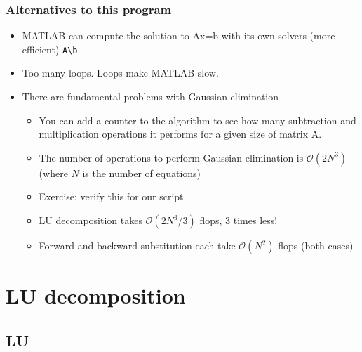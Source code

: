 \begin{frame}[fragile]
  \frametitle{Alternatives to this program}
  \begin{itemize}
    \item MATLAB can compute the solution to Ax=b with its own solvers (more efficient) \lstinline$A\b$
    \item Too many loops. Loops make MATLAB slow.
    \item There are fundamental problems with Gaussian elimination\pause
    \begin{itemize}
      \item You can add a counter to the algorithm to see how many subtraction and multiplication operations it performs for a given size of matrix A.
      \item The number of operations to perform Gaussian elimination is $\mathcal{O}(2N^3)$ (where $N$ is the number of equations) 
      \item Exercise: verify this for our script \pause
      \item LU decomposition takes $\mathcal{O}(2N^3/3)$ flops, 3 times less!
      \item Forward and backward substitution each take $\mathcal{O}(N^2)$
flops (both cases) 
    \end{itemize}
  \end{itemize}
\end{frame}

\section{LU decomposition}
\subsection*{LU}

